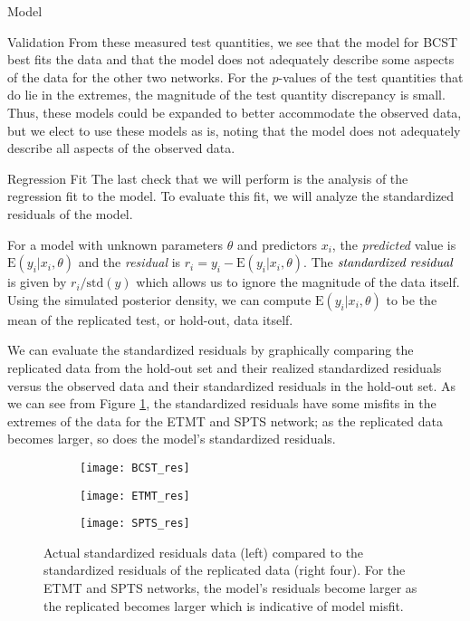 \begin{chapter}{Model}
\begin{section}{Validation}
    From these measured test quantities, we see that the model for BCST best fits the data and that
    the model does not adequately describe some aspects of the data for the other two networks.
    For the $p$-values of the test quantities that do lie in the extremes, the magnitude
    of the test quantity discrepancy is small. Thus, these models could be expanded to better accommodate
    the observed data, but we elect to use these models as is, noting that the
    model does not adequately describe all aspects of the observed data.

  \begin{subsection}{Regression Fit}
    The last check that we will perform is the analysis of the regression fit to the
    model. To evaluate this fit, we will analyze the standardized residuals of the model.

    For a model with unknown parameters $\theta$ and predictors $x_i$, the \emph{predicted}
    value is $\text{E}(y_i | x_i, \theta)$ and the \emph{residual} is $r_i = y_i - \text{E}(y_i | x_i, \theta)$.
    The $\emph{standardized residual}$ is given by $r_i / \text{std}(y)$ which allows us to
    ignore the magnitude of the data itself. Using the simulated posterior density,
    we can compute $\text{E}(y_i | x_i, \theta)$
    to be the mean of the replicated test, or hold-out, data itself.

    We can evaluate the standardized residuals by graphically comparing the replicated data from the hold-out set
    and their realized standardized residuals versus the observed data and their standardized residuals in the hold-out set.
    As we can see from Figure \ref{fig:res}, the standardized residuals have some misfits in the extremes of the data
    for the ETMT and SPTS network; as the replicated data becomes larger, so does the model's standardized residuals.

    \begin{figure}[!h]
      \begin{subfigure}[b]{.75\textwidth}
        \centering
        \texttt{[image: BCST\_res]}
      \end{subfigure}
      \begin{subfigure}[b]{.75\textwidth}
        \centering
        \texttt{[image: ETMT\_res]}
      \end{subfigure}
      \begin{subfigure}[b]{.75\textwidth}
        \centering
        \texttt{[image: SPTS\_res]}
      \end{subfigure}
      \caption{Actual standardized residuals data (left) compared to the standardized residuals of the replicated data (right four). For the ETMT and SPTS
        networks, the model's residuals become larger as the replicated becomes larger which is indicative of model misfit.}
      \label{fig:res}
    \end{figure}


\end{subsection}
\end{section}
\end{chapter}
